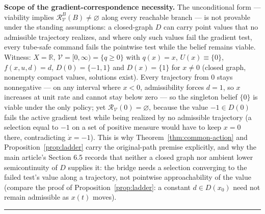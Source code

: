 \documentclass[11pt]{article}
\theoremstyle{definition}
\begin{document}
\bigskip
\noindent\textbf{Scope of the gradient-correspondence necessity.} The
unconditional form --- viability implies
\(\mathcal{R}_{\mathcal{V}}^{B}(B) \neq \varnothing\) along every
reachable branch --- is not provable under the standing assumptions: a
closed-graph \(D\) can carry point values that no admissible
trajectory realizes, and where only such values fail the gradient
test, every tube-safe command fails the pointwise test while the
belief remains viable. Witness: \(X = \mathbb{R}\),
\(\mathcal{V} = [0, \infty) = \{q \ge 0\}\) with \(q(x) = x\),
\(U(x) \equiv \{0\}\), \(f(x, u, d) = d\), \(D(0) = \{-1, 1\}\) and
\(D(x) = \{1\}\) for \(x \neq 0\) (closed graph, nonempty compact
values, solutions exist). Every trajectory from \(0\) stays
nonnegative --- on any interval where \(x < 0\), admissibility forces
\(d = 1\), so \(x\) increases at unit rate and cannot stay below zero
--- so the singleton belief \(\{0\}\) is viable under the only policy;
yet \(\mathcal{R}_{\mathcal{V}}(0) = \varnothing\), because the value
\(-1 \in D(0)\) fails the active gradient test while being realized by
no admissible trajectory (a selection equal to \(-1\) on a set of
positive measure would have to keep \(x = 0\) there, contradicting
\(\dot x = -1\)). This is why Theorem~\ref{thm:common-action} and
Proposition~\ref{prop:ladder} carry the original-path premise
explicitly, and why the main article's Section 6.5 records that
neither a closed graph nor ambient lower semicontinuity of \(D\)
supplies it: the bridge needs a selection converging to the failed
test's value along a trajectory, not pointwise approachability of the
value (compare the proof of Proposition~\ref{prop:ladder}: a constant
\(d \in D(x_0)\) need not remain admissible as \(x(t)\) moves).
\rule{0.5\linewidth}{0.5pt}
\end{document}
